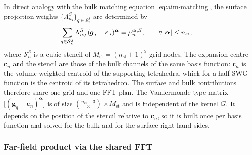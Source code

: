 \documentclass[11pt,a4paper]{article}
\begin{document}
In direct analogy with the bulk matching equation
\eqref{eq:aim-matching}, the surface projection weights
$\{\Lambda^{S}_{nq}\}_{q \in \mathcal{S}^{S}_n}$ are determined by
\begin{equation}
  \sum_{q \in \mathcal{S}^{S}_n}
    \Lambda^{S}_{nq}\,(\bm{g}_q - \bm{c}_n)^{\bm{\alpha}}
  = \mu_n^{\bm{\alpha},S},
  \qquad \forall\,\abs{\bm{\alpha}} \le n_{\text{st}},
  \label{eq:surf-matching}
\end{equation}
where $\mathcal{S}^{S}_n$ is a cubic stencil of
$M_{\text{st}} = (n_{\text{st}}+1)^{3}$ grid nodes. The expansion
centre $\bm{c}_n$ and the stencil are those of the bulk channels of the
same basis function: $\bm{c}_n$ is the volume-weighted centroid of the
supporting tetrahedra, which for a half-SWG function is the centroid of
its tetrahedron. The surface and bulk contributions therefore share one
grid and one FFT plan. The Vandermonde-type matrix
$\bigl[(\bm{g}_q-\bm{c}_n)^{\bm{\alpha}}\bigr]$ is of size
$\binom{n_{\text{st}}+3}{3}\times M_{\text{st}}$ and is independent of
the kernel $G$. It depends on the position of the stencil relative to
$\bm{c}_n$, so it is built once per basis function and solved for the
bulk and for the surface right-hand sides.

\subsubsection*{Far-field product via the shared FFT}
\end{document}
